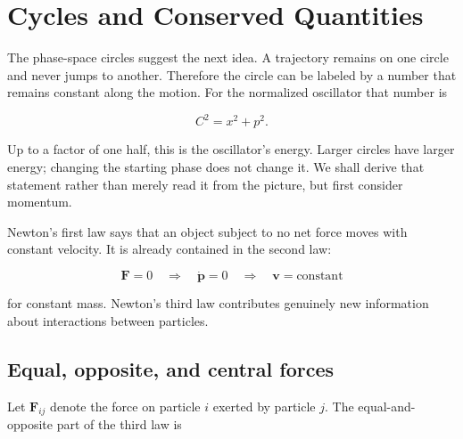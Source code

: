 \begin{classroomqa}
\end{classroomqa}

\section{Cycles and Conserved Quantities}

The phase-space circles suggest the next idea.  A trajectory remains on one
circle and never jumps to another.  Therefore the circle can be labeled by a
number that remains constant along the motion.  For the normalized oscillator
that number is

\begin{equation}
  C^2=x^2+p^2.
  \label{eq:cycle-label}
\end{equation}

Up to a factor of one half, this is the oscillator's energy.  Larger circles
have larger energy; changing the starting phase does not change it.  We shall
derive that statement rather than merely read it from the picture, but first
consider momentum.

Newton's first law says that an object subject to no net force moves with
constant velocity.  It is already contained in the second law:

\begin{equation}
  \mathbf F=0
  \quad\Longrightarrow\quad
  \dot{\mathbf p}=0
  \quad\Longrightarrow\quad
  \mathbf v=\text{constant}
  \label{eq:newton-first-from-second}
\end{equation}

for constant mass.  Newton's third law contributes genuinely new information
about interactions between particles.

\subsection{Equal, opposite, and central forces}

Let \(\mathbf F_{ij}\) denote the force on particle \(i\) exerted by particle
\(j\).  The equal-and-opposite part of the third law is

